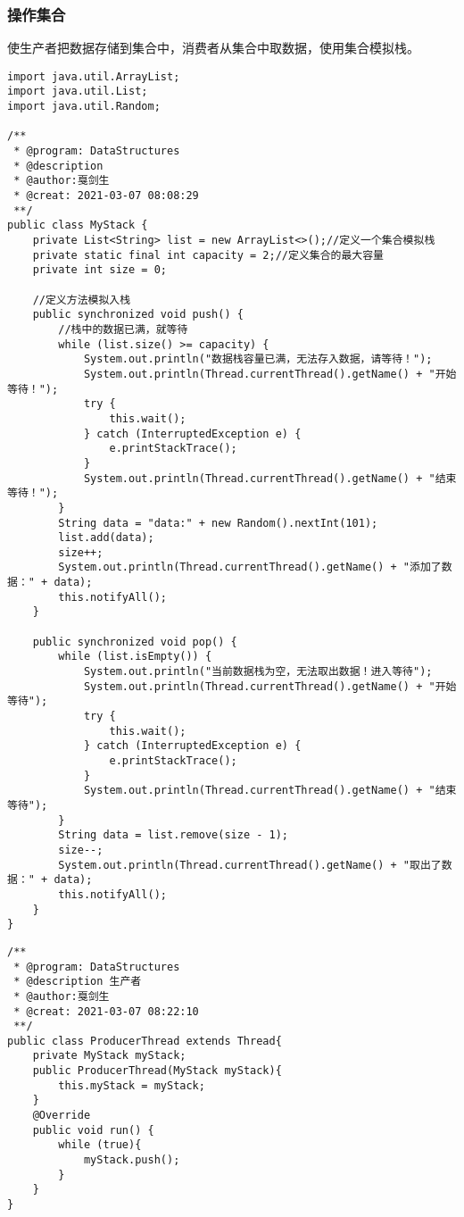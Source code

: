 \documentclass[a4paper]{report}
\begin{document}
\subsubsection{操作集合}
使生产者把数据存储到集合中，消费者从集合中取数据，使用集合模拟栈。
\begin{lstlisting}[title = 操作栈的类]
import java.util.ArrayList;
import java.util.List;
import java.util.Random;

/**
 * @program: DataStructures
 * @description
 * @author:戛剑生
 * @creat: 2021-03-07 08:08:29
 **/
public class MyStack {
    private List<String> list = new ArrayList<>();//定义一个集合模拟栈
    private static final int capacity = 2;//定义集合的最大容量
    private int size = 0;

    //定义方法模拟入栈
    public synchronized void push() {
        //栈中的数据已满，就等待
        while (list.size() >= capacity) {
            System.out.println("数据栈容量已满，无法存入数据，请等待！");
            System.out.println(Thread.currentThread().getName() + "开始等待！");
            try {
                this.wait();
            } catch (InterruptedException e) {
                e.printStackTrace();
            }
            System.out.println(Thread.currentThread().getName() + "结束等待！");
        }
        String data = "data:" + new Random().nextInt(101);
        list.add(data);
        size++;
        System.out.println(Thread.currentThread().getName() + "添加了数据：" + data);
        this.notifyAll();
    }

    public synchronized void pop() {
        while (list.isEmpty()) {
            System.out.println("当前数据栈为空，无法取出数据！进入等待");
            System.out.println(Thread.currentThread().getName() + "开始等待");
            try {
                this.wait();
            } catch (InterruptedException e) {
                e.printStackTrace();
            }
            System.out.println(Thread.currentThread().getName() + "结束等待");
        }
        String data = list.remove(size - 1);
        size--;
        System.out.println(Thread.currentThread().getName() + "取出了数据：" + data);
        this.notifyAll();
    }
}
\end{lstlisting}
\begin{lstlisting}[title = 生产者]
/**
 * @program: DataStructures
 * @description 生产者
 * @author:戛剑生
 * @creat: 2021-03-07 08:22:10
 **/
public class ProducerThread extends Thread{
    private MyStack myStack;
    public ProducerThread(MyStack myStack){
        this.myStack = myStack;
    }
    @Override
    public void run() {
        while (true){
            myStack.push();
        }
    }
}
\end{lstlisting}
\end{document}
